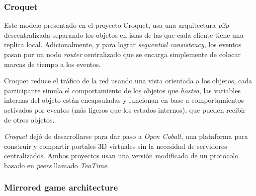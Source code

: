 \subsubsection{Croquet}

Este modelo presentado en el proyecto Croquet, usa una arquitectura \emph{p2p} descentralizada separando los objetos en islas de las que cada cliente tiene una replica local. Adicionalmente, y para lograr \emph{sequential consistency}, los eventos pasan por un nodo \emph{router} centralizado que se encarga simplemente de colocar marcas de tiempo a los eventos.

Croquet reduce el tráfico de la red usando una vista orientada a los objetos, cada participante simula el comportamiento de los objetos que \emph{hostea}, las variables internas del objeto están encapsuladas y funcionan en base a comportamientos activados por eventos (más ligeros que los estados internos), que pueden recibir de otros objetos.

\emph{Croquet} dejó de desarrollarse para dar paso a \emph{Open Cobalt}, una plataforma para construír y compartir portales 3D virtuales sin la necesidad de servidores centralizados. Ambos proyectos usan una versión modificada de un protocolo basado en \emph{peers} llamado \emph{TeaTime}.

\subsubsection{Mirrored game architecture}




